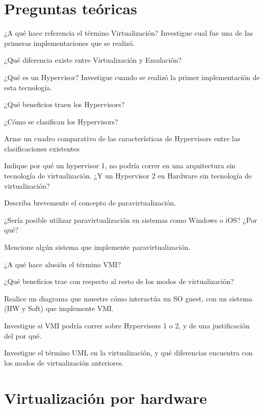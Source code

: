 \section{Preguntas teóricas}

\begin{questions}
\question ¿A qué hace referencia el término Virtualización? Investigue cual
fue una de las primeras implementaciones que se realizó.

\question ¿Qué diferencia existe entre Virtualización y Emulación?

\question ¿Qué es un Hypervisor? Investigue cuando se realizó la primer
implementación de esta tecnología.

\question ¿Qué beneficios traen los Hypervisors?

\question ¿Cómo se clasifican los Hypervisors? 

\question Arme un cuadro comparativo de las características de Hypervisors
entre las clasificaciones existentes

\question Indique por qué un hypervisor 1, no podría correr en una
arquitectura sin tecnología de virtualización. ¿Y un Hypervisor 2 en
Hardware sin tecnología de virtualización?

\question Describa brevemente el concepto de paravirtualización.

\question ¿Sería posible utilizar paravirtualización en sistemas como
Windows o iOS? ¿Por qué?

\question Mencione algún sistema que implemente paravirtualización.

\question ¿A qué hace alusión el término VMI?

\question ¿Qué beneficios trae con respecto al resto de los modos de
virtualización?

\question Realice un diagrama que muestre cómo interactúa un SO guest, con
un sistema (HW y Soft) que implemente VMI.

\question Investigue si VMI podría correr sobre Hypervisors 1 o 2, y de una
justificación del por qué.

\question Investigue el término UML en la virtualización, y qué diferencias
encuentra con los modos de virtualización anteriores.

\end{questions}

\section{Virtualización por hardware}

